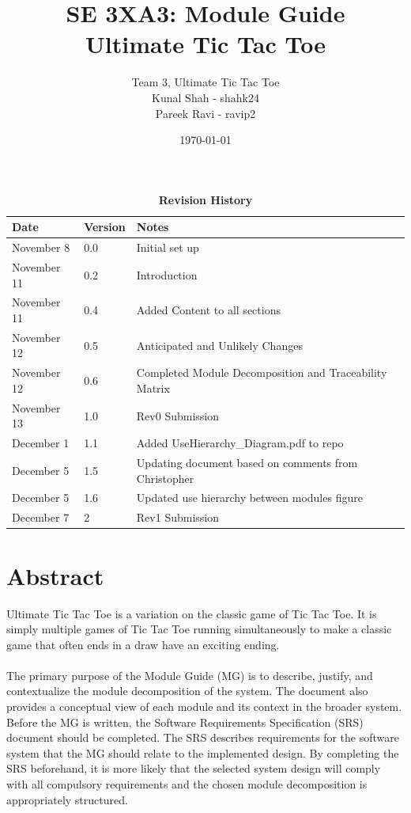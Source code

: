 \documentclass[12pt, titlepage]{article}
\title{SE 3XA3: Module Guide\\Ultimate Tic Tac Toe}
\author{Team 3, Ultimate Tic Tac Toe
		\\ Kunal Shah - shahk24
		\\ Pareek Ravi - ravip2
}
\date{\today}
\begin{document}
\maketitle

\tableofcontents
\listoftables
\listoffigures


\newpage
\begin{table}[hp]
\caption{\bf Revision History}
\begin{tabularx}{\textwidth}{llX}
\toprule {\bf Date} & {\bf Version} & {\bf Notes}\\
\midrule
November 8  & 0.0 & Initial set up\\
November 11 & 0.2 & Introduction \\
November 11 & 0.4 & Added Content to all sections \\
November 12 & 0.5 & Anticipated and Unlikely Changes\\ 
November 12 & 0.6 & Completed Module Decomposition and Traceability Matrix\\ 
November 13 & 1.0 & Rev0 Submission\\
December 1 & 1.1 & Added UseHierarchy\_Diagram.pdf to repo\\
December 5 & 1.5 & Updating document based on comments from Christopher \\
December 5 & 1.6 & Updated use hierarchy between modules figure\\
December 7 & 2 & Rev1 Submission \\
\bottomrule
\end{tabularx}
\end{table}
\newpage

\section*{Abstract}
Ultimate Tic Tac Toe is a variation on the classic game of Tic Tac Toe. It is 
simply multiple games of Tic Tac Toe running simultaneously to make a classic 
game that often ends in a draw have an exciting ending.\\\\
The primary purpose of the Module Guide (MG) is to describe, justify, and
contextualize the module decomposition of the system. The document also provides
a conceptual view of each module and its context in the broader system. Before
the MG is written, the Software Requirements Specification (SRS) document should
be completed. The SRS describes requirements for the software system that the MG
should relate to the implemented design. By completing the SRS beforehand, it
is more likely that the selected system design will comply with all compulsory
requirements and the chosen module decomposition is appropriately structured.
\end{document}
